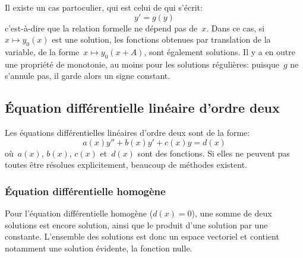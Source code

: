 Il existe un cas partoculier, qui est celui de  qui s'écrit:
\begin{equation}
y' = g(y)
\end{equation}
c'est-à-dire que la relation formelle ne dépend pas de~$x$. Dans ce cas, si~$x \mapsto y_0(x)$ est une solution, les fonctions obtenues par translation de la variable, de la forme~$x \mapsto y_0(x+A)$, sont également solutions. Il y a en outre une propriété de monotonie, au moins pour les solutions régulières: puisque~$g$ ne s'annule pas, il garde alors un signe constant. 
 
\subsection{Équation différentielle linéaire d'ordre deux} 
Les équations différentielles linéaires d'ordre deux sont de la forme:
\begin{equation}
a(x)y'' + b(x)y' + c(x)y = d(x)
\end{equation}
où~$a(x)$, $b(x)$, $c(x)$ et~$d(x)$ sont des fonctions. Si elles ne peuvent pas toutes être résolues explicitement, beaucoup de méthodes existent. 
\subsubsection{Équation différentielle homogène} Pour l'équation différentielle homogène ($d(x)=0$), une somme de deux solutions est encore solution, ainsi que le produit d'une solution par une constante. L'ensemble des solutions est donc un espace vectoriel et contient notamment une solution évidente, la fonction nulle. 
